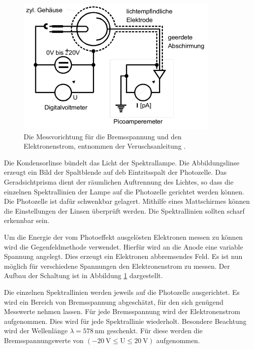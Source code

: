   \begin{figure}
    \centering
    \includegraphics[width=0.7\linewidth]{images/Messung.png}
    \caption{Die Messvorichtung für die Bremsspannung und den Elektronenstrom, entnommen der Veruschsanleitung \cite{sample}.}
    \label{fig:Messung}
  \end{figure}

Die Kondensorlinse bündelt das Licht der Spektrallampe.
Die Abbildungslinse erzeugt ein Bild der Spaltblende auf deb Eintritsspalt der Photozelle.
Das Geradsichtprisma dient der räumlichen Auftrennung des Lichtes, so dass die einzelnen Spektrallinien der Lampe auf die Photozelle gerichtet werden können.
Die Photozelle ist dafür schwenkbar gelagert.
Mithilfe eines Mattschirmes können die Einstellungen der Linsen überprüft werden.
Die Spektrallinien sollten scharf erkennbar sein.

Um die Energie der vom Photoeffekt ausgelösten Elektronen messen zu können wird die Gegenfeldmethode verwendet.
Hierfür wird an die Anode eine variable Spannung angelegt.
Dies erzeugt ein Elektronen abbremsendes Feld.
Es ist nun möglich für verschiedene Spannungen den Elektronenstrom zu messen.
Der Aufbau der Schaltung ist in Abbildung \ref{fig:Messung} dargestellt.

Die einzelnen Spektrallinien werden jeweils auf die Photozelle ausgerichtet.
Es wird ein Bereich von Bremsspannung abgeschätzt, für den sich genügend Messwerte nehmen lassen.
Für jede Bremsspannung wird der Elektronenstrom aufgenommen.
Dies wird für jede Spektrallinie wiederholt.
Besondere Beachtung wird der Wellenlänge $\lambda = \SI{578}{\nano\metre}$ geschenkt.
Für diese werden die Bremsspannungswerte von $ (\SI{-20}{\volt} \leq \text{U} \leq \SI{+20}{\volt})$ aufgenommen.
